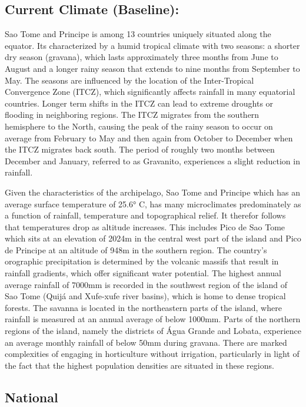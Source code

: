 \documentclass[
]{book}
\begin{document}
\hypertarget{current-climate-baseline-1}{%
\subsection{Current Climate (Baseline):}\label{current-climate-baseline-1}}

Sao Tome and Principe is among 13 countries uniquely situated along the equator. Its characterized by a humid tropical climate with two seasons: a shorter dry season (gravana), which lasts approximately three months from June to August and a longer rainy season that extends to nine months from September to May. The seasons are influenced by the location of the Inter-Tropical Convergence Zone (ITCZ), which significantly affects rainfall in many equatorial countries. Longer term shifts in the ITCZ can lead to extreme droughts or flooding in neighboring regions. The ITCZ migrates from the southern hemisphere to the North, causing the peak of the rainy season to occur on average from February to May and then again from October to December when the ITCZ migrates back south. The period of roughly two months between December and January, referred to as Gravanito, experiences a slight reduction in rainfall.

Given the characteristics of the archipelago, Sao Tome and Principe which has an average surface temperature of 25.6° C, has many microclimates predominately as a function of rainfall, temperature and topographical relief. It therefor follows that temperatures drop as altitude increases. This includes Pico de Sao Tome which sits at an elevation of 2024m in the central west part of the island and Pico de Principe at an altitude of 948m in the southern region. The country's orographic precipitation is determined by the volcanic massifs that result in rainfall gradients, which offer significant water potential. The highest annual average rainfall of 7000mm is recorded in the southwest region of the island of Sao Tome (Quijá and Xufe-xufe river basins), which is home to dense tropical forests. The savanna is located in the northeastern parts of the island, where rainfall is measured at an annual average of below 1000mm. Parts of the northern regions of the island, namely the districts of Água Grande and Lobata, experience an average monthly rainfall of below 50mm during gravana. There are marked complexities of engaging in horticulture without irrigation, particularly in light of the fact that the highest population densities are situated in these regions.

\hypertarget{national-1}{%
\subsection{National}\label{national-1}}
\end{document}
